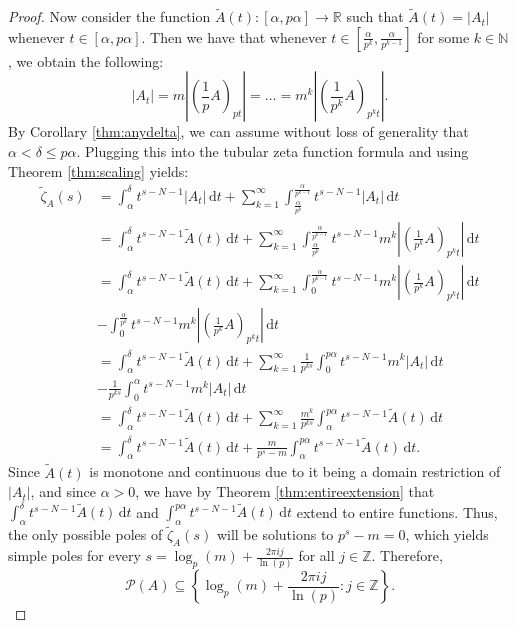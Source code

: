 \documentclass[10pt,a4paper]{amsart}
\begin{document}
\begin{proof}
Now consider the function $\tilde{A}(t) : [\alpha, p\alpha] \rightarrow \mathbb{R}$ such that $\tilde{A}(t) = |A_t|$ whenever $t \in [\alpha,p\alpha]$. Then we have that whenever $t \in \left[\frac{\alpha}{p^k}, \frac{\alpha}{p^{k-1}}\right]$ for some $k \in \mathbb{N}$, we obtain the following:
\begin{equation}
|A_t| = m \left|\left(\frac{1}{p} A\right)_{p t}\right| =\dots= m^k \left|\left(\frac{1}{p^k} A\right)_{p^k t}\right|.
\end{equation}
By Corollary \ref{thm:anydelta}, we can assume without loss of generality that $\alpha < \delta \leq p\alpha$. Plugging this into the tubular zeta function formula and using Theorem \ref{thm:scaling} yields:
\begin{align}
\tilde{\zeta}_A(s)
&= \int_{\alpha}^{\delta} t^{s-N-1} |A_t| \,\mathrm{d}t + \sum_{k=1}^{\infty} \int_{\frac{\alpha}{p^k}}^{\frac{\alpha}{p^{k-1}}} t^{s-N-1} |A_t| \,\mathrm{d}t \\
&= \int_{\alpha}^{\delta} t^{s-N-1} \tilde{A}(t) \,\mathrm{d}t + \sum_{k=1}^{\infty} \int_{\frac{\alpha}{p^k}}^{\frac{\alpha}{p^{k-1}}} t^{s-N-1} m^k \left|\left(\frac{1}{p^k} A\right)_{p^k t}\right| \,\mathrm{d}t\\
&= \int_{\alpha}^{\delta} t^{s-N-1} \tilde{A}(t) \,\mathrm{d}t + \sum_{k=1}^{\infty} \int_0^{\frac{\alpha}{p^{k-1}}} t^{s-N-1} m^k \left|\left(\frac{1}{p^k} A\right)_{p^k t}\right| \,\mathrm{d}t \nonumber\\&- \int_0^{\frac{\alpha}{p^k}} t^{s-N-1} m^k \left|\left(\frac{1}{p^k} A\right)_{p^k t}\right| \,\mathrm{d}t \\
&= \int_{\alpha}^{\delta} t^{s-N-1} \tilde{A}(t) \,\mathrm{d}t + \sum_{k=1}^{\infty} \frac{1}{p^{k s}} \int_0^{p\alpha} t^{s-N-1} m^k \left|A_t\right| \,\mathrm{d}t \nonumber\\&- \frac{1}{p^{k s}} \int_0^{\alpha} t^{s-N-1} m^k \left|A_t\right| \,\mathrm{d}t\\
&= \int_{\alpha}^{\delta} t^{s-N-1} \tilde{A}(t) \,\mathrm{d}t + \sum_{k=1}^{\infty} \frac{m^k}{p^{k s}} \int_{\alpha}^{p\alpha} t^{s-N-1} \tilde{A}(t) \,\mathrm{d}t \\
&= \int_{\alpha}^{\delta} t^{s-N-1} \tilde{A}(t) \,\mathrm{d}t + \frac{m}{p^s - m} \int_{\alpha}^{p\alpha} t^{s-N-1} \tilde{A}(t) \,\mathrm{d}t.
\end{align}
Since $\tilde{A}(t)$ is monotone and continuous due to it being a domain restriction of $|A_t|$, and since $\alpha > 0$, we have by Theorem \ref{thm:entireextension} that $\displaystyle \int_{\alpha}^{\delta} t^{s-N-1} \tilde{A}(t) \,\mathrm{d}t$ and $\displaystyle \int_{\alpha}^{p\alpha} t^{s-N-1} \tilde{A}(t) \,\mathrm{d}t$ extend to entire functions. Thus, the only possible poles of $\tilde{\zeta}_A(s)$ will be solutions to $p^s - m = 0$, which yields simple poles for every $s = \log_p(m) + \frac{2\pi i j}{\ln(p)}$ for all $j \in \mathbb{Z}$. Therefore,
\begin{equation}
\mathscr{P}(A) \subseteq \left\{\log_p(m) + \frac{2\pi i j}{\ln(p)}: j \in \mathbb{Z}\right\}.
\end{equation}
\end{proof}
\end{document}
